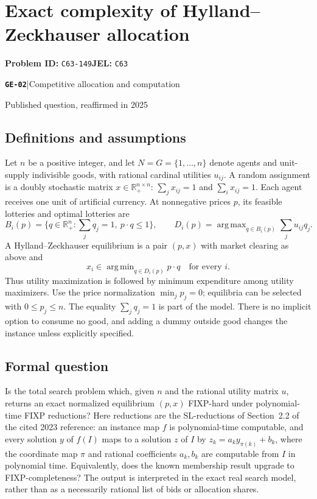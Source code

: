 \documentclass[11pt,a4paper]{article}
\newcommand{\R}{\mathbb R}
\DeclareMathOperator*{\argmin}{arg\,min}
\DeclareMathOperator*{\argmax}{arg\,max}
\newcommand{\entrymeta}[3]{{\sffamily\small\color{muted}\textbf{\texttt{#1}}\quad|\quad #2\par #3\par}}
\begin{document}
\section*{Exact complexity of Hylland--Zeckhauser allocation}
\textbf{Problem ID:} \texttt{C63-149}\quad \textbf{JEL:} \texttt{C63}\par
\label{problem:OP-0574}
\label{beyond:GE-02}
\entrymeta{GE-02}{Competitive allocation and computation}{Published question, reaffirmed in 2025}
\subsection*{Definitions and assumptions}
Let $n$ be a positive integer, and let $N=G=\{1,\ldots,n\}$ denote agents and unit-supply indivisible goods, with rational cardinal utilities $u_{ij}$. A random assignment is a doubly stochastic matrix $x\in\R^{n\times n}_+$: $\sum_jx_{ij}=1$ and $\sum_ix_{ij}=1$. Each agent receives one unit of artificial currency. At nonnegative prices $p$, its feasible lotteries and optimal lotteries are
\[
 B_i(p)=\{q\in\R^n_+:\textstyle\sum_jq_j=1,\ p\cdot q\le1\},\qquad
 D_i(p)=\argmax_{q\in B_i(p)}\sum_ju_{ij}q_j.
\]
A Hylland--Zeckhauser equilibrium is a pair $(p,x)$ with market clearing as above and
\[
 x_i\in\argmin_{q\in D_i(p)}p\cdot q\quad\text{for every }i.
\]
Thus utility maximization is followed by minimum expenditure among utility maximizers. Use the price normalization $\min_jp_j=0$; equilibria can be selected with $0\le p_j\le n$. The equality $\sum_jq_j=1$ is part of the model. There is no implicit option to consume no good, and adding a dummy outside good changes the instance unless explicitly specified.
\subsection*{Formal question}
Is the total search problem which, given $n$ and the rational utility matrix $u$, returns an exact normalized equilibrium $(p,x)$ FIXP-hard under polynomial-time FIXP reductions? Here reductions are the SL-reductions of Section~2.2 of the cited 2023 reference: an instance map $f$ is polynomial-time computable, and every solution $y$ of $f(I)$ maps to a solution $z$ of $I$ by $z_k=a_k y_{\pi(k)}+b_k$, where the coordinate map $\pi$ and rational coefficients $a_k,b_k$ are computable from $I$ in polynomial time. Equivalently, does the known membership result upgrade to FIXP-completeness? The output is interpreted in the exact real search model, rather than as a necessarily rational list of bids or allocation shares.
\end{document}
